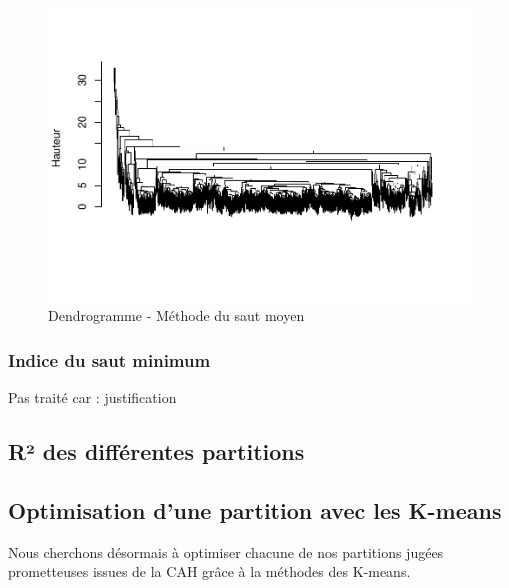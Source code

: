 \documentclass[
]{article}
\begin{document}
\begin{figure}[H]

{\centering \includegraphics{ADM_DM2_EL_MAZZOUJI_Wahel_GILLET_Louison_files/figure-latex/DendrogrammeMoy-1} 

}

\caption{Dendrogramme - Méthode du saut moyen}\label{fig:DendrogrammeMoy}
\end{figure}

\hypertarget{indice-du-saut-minimum}{%
\subsubsection{Indice du saut minimum}\label{indice-du-saut-minimum}}

Pas traité car : justification

\hypertarget{ruxb2-des-diffuxe9rentes-partitions}{%
\subsection{R² des différentes
partitions}\label{ruxb2-des-diffuxe9rentes-partitions}}

\hypertarget{optimisation-dune-partition-avec-les-k-means}{%
\subsection{Optimisation d'une partition avec les
K-means}\label{optimisation-dune-partition-avec-les-k-means}}

Nous cherchons désormais à optimiser chacune de nos partitions jugées
prometteuses issues de la CAH grâce à la méthodes des K-means.
\end{document}
